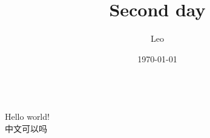 \documentclass{article}        %
\title{Second day}
\author{Leo}
\date{\today}
\begin{document}
\maketitle
\\
Hello world! \\
中文可以吗
\end{document}
